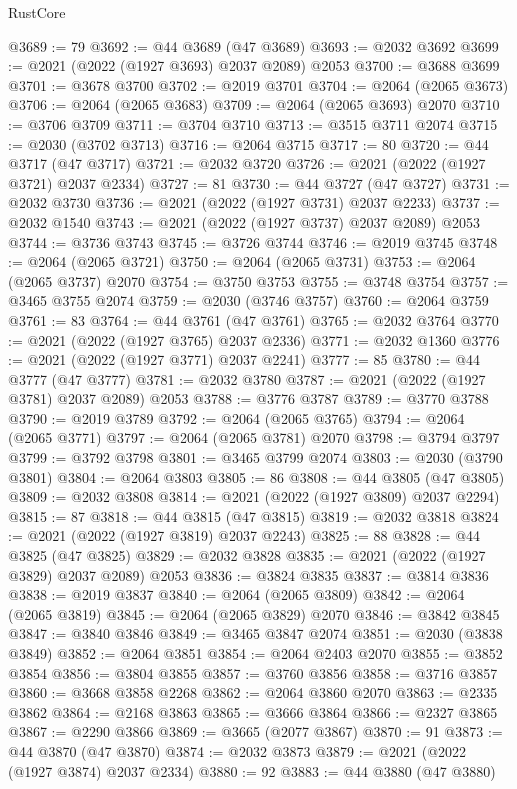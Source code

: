 \begin{lexlean}{RustCore}
\begin{coremodule}
@3689 := 79
@3692 := @44 @3689 (@47 @3689)
@3693 := @2032 @3692
@3699 := @2021 (@2022 (@1927 @3693) @2037 @2089) @2053
@3700 := @3688 @3699
@3701 := @3678 @3700
@3702 := @2019 @3701
@3704 := @2064 (@2065 @3673)
@3706 := @2064 (@2065 @3683)
@3709 := @2064 (@2065 @3693) @2070
@3710 := @3706 @3709
@3711 := @3704 @3710
@3713 := @3515 @3711 @2074
@3715 := @2030 (@3702 @3713)
@3716 := @2064 @3715
@3717 := 80
@3720 := @44 @3717 (@47 @3717)
@3721 := @2032 @3720
@3726 := @2021 (@2022 (@1927 @3721) @2037 @2334)
@3727 := 81
@3730 := @44 @3727 (@47 @3727)
@3731 := @2032 @3730
@3736 := @2021 (@2022 (@1927 @3731) @2037 @2233)
@3737 := @2032 @1540
@3743 := @2021 (@2022 (@1927 @3737) @2037 @2089) @2053
@3744 := @3736 @3743
@3745 := @3726 @3744
@3746 := @2019 @3745
@3748 := @2064 (@2065 @3721)
@3750 := @2064 (@2065 @3731)
@3753 := @2064 (@2065 @3737) @2070
@3754 := @3750 @3753
@3755 := @3748 @3754
@3757 := @3465 @3755 @2074
@3759 := @2030 (@3746 @3757)
@3760 := @2064 @3759
@3761 := 83
@3764 := @44 @3761 (@47 @3761)
@3765 := @2032 @3764
@3770 := @2021 (@2022 (@1927 @3765) @2037 @2336)
@3771 := @2032 @1360
@3776 := @2021 (@2022 (@1927 @3771) @2037 @2241)
@3777 := 85
@3780 := @44 @3777 (@47 @3777)
@3781 := @2032 @3780
@3787 := @2021 (@2022 (@1927 @3781) @2037 @2089) @2053
@3788 := @3776 @3787
@3789 := @3770 @3788
@3790 := @2019 @3789
@3792 := @2064 (@2065 @3765)
@3794 := @2064 (@2065 @3771)
@3797 := @2064 (@2065 @3781) @2070
@3798 := @3794 @3797
@3799 := @3792 @3798
@3801 := @3465 @3799 @2074
@3803 := @2030 (@3790 @3801)
@3804 := @2064 @3803
@3805 := 86
@3808 := @44 @3805 (@47 @3805)
@3809 := @2032 @3808
@3814 := @2021 (@2022 (@1927 @3809) @2037 @2294)
@3815 := 87
@3818 := @44 @3815 (@47 @3815)
@3819 := @2032 @3818
@3824 := @2021 (@2022 (@1927 @3819) @2037 @2243)
@3825 := 88
@3828 := @44 @3825 (@47 @3825)
@3829 := @2032 @3828
@3835 := @2021 (@2022 (@1927 @3829) @2037 @2089) @2053
@3836 := @3824 @3835
@3837 := @3814 @3836
@3838 := @2019 @3837
@3840 := @2064 (@2065 @3809)
@3842 := @2064 (@2065 @3819)
@3845 := @2064 (@2065 @3829) @2070
@3846 := @3842 @3845
@3847 := @3840 @3846
@3849 := @3465 @3847 @2074
@3851 := @2030 (@3838 @3849)
@3852 := @2064 @3851
@3854 := @2064 @2403 @2070
@3855 := @3852 @3854
@3856 := @3804 @3855
@3857 := @3760 @3856
@3858 := @3716 @3857
@3860 := @3668 @3858 @2268
@3862 := @2064 @3860 @2070
@3863 := @2335 @3862
@3864 := @2168 @3863
@3865 := @3666 @3864
@3866 := @2327 @3865
@3867 := @2290 @3866
@3869 := @3665 (@2077 @3867)
@3870 := 91
@3873 := @44 @3870 (@47 @3870)
@3874 := @2032 @3873
@3879 := @2021 (@2022 (@1927 @3874) @2037 @2334)
@3880 := 92
@3883 := @44 @3880 (@47 @3880)

\end{coremodule}
\end{lexlean}
